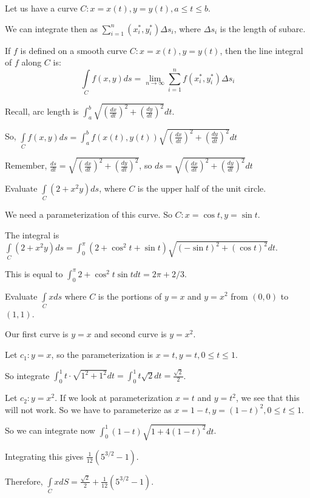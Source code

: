 \documentclass[../calc3.tex]{subfiles}
\begin{document}
Let us have a curve $C: x=x(t), y=y(t), a\leq t\leq b$.

We can integrate then as $\sum_{i=1}^{n}\left(x_i^*, y_i^*\right)\Delta s_i$, where $\Delta s_i$ is the length of subarc.

\begin{definition}
    If $f$ is defined on a smooth curve $C: x=x(t), y=y(t)$, then the line integral of $f$ along $C$ is:
    \[ \int\limits_{C} f(x,y)ds = \lim_{n\to\infty}\sum_{i=1}^n f\left(x_i^*,y_i^*\right)\Delta s_i \]
\end{definition}

Recall, arc length is $\int_a^b \sqrt{\left(\frac{dx}{dt}\right)^2+\left(\frac{dy}{dt}\right)^2}dt$.

So, $\int\limits_{C} f(x,y)ds = \int_a^b f(x(t),y(t)) \sqrt{\left(\frac{dx}{dt}\right)^2+\left(\frac{dy}{dt}\right)^2}dt$

Remember, $\frac{ds}{dt}=\sqrt{\left(\frac{dx}{dt}\right)^2+\left(\frac{dy}{dt}\right)^2}$, so $ds=\sqrt{\left(\frac{dx}{dt}\right)^2+\left(\frac{dy}{dt}\right)^2}dt$

\pagebreak
\begin{example}
    Evaluate $\int\limits_{C} (2+x^2y)ds$, where $C$ is the upper half of the unit circle.

    We need a parameterization of this curve. So $C: x=\cos t, y=\sin t$.

    The integral is $\int\limits_{C} (2+x^2y)ds = \int_0^{\pi} (2+\cos^2 t+\sin t)\sqrt{(-\sin t)^2+(\cos t)^2}dt$.

    This is equal to $\int_0^{\pi} 2+\cos^2 t\sin t dt = 2\pi + 2/3$.
\end{example}

\begin{example}
    Evaluate $\int\limits_{C} xds$ where $C$ is the portions of $y=x$ and $y=x^2$ from $(0,0)$ to $(1,1)$.

    Our first curve is $y=x$ and second curve is $y=x^2$.

    Let $c_1: y=x$, so the parameterization is $x=t, y=t, 0\leq t\leq 1$.

    So integrate $\int_0^1 t\cdot \sqrt{1^2+1^2}dt = \int_0^1 t\sqrt{2}dt = \frac{\sqrt{2}}{2}$.

    Let $c_2: y=x^2$. If we look at parameterization $x=t$ and $y=t^2$, we see that this will not work. So we have to parameterize as $x=1-t, y=(1-t)^2, 0\leq t\leq 1$.

    So we can integrate now $\int_0^1 (1-t)\sqrt{1+4(1-t)^2}dt$.

    Integrating this gives $\frac{1}{12}(5^{3/2}-1)$.

    Therefore, $\int\limits_{C} xdS = \frac{\sqrt{2}}{2}+\frac{1}{12}(5^{3/2}-1)$.
\end{example}
\end{document}

